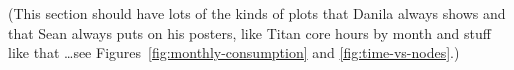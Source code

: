 
%
%


%
%
%
%
%


(This section should have lots of the kinds of plots that Danila always shows
and that Sean always puts on his posters, like Titan core hours by month and
stuff like that \ldots see Figures~\ref{fig:monthly-consumption} and
\ref{fig:time-vs-nodes}.)

